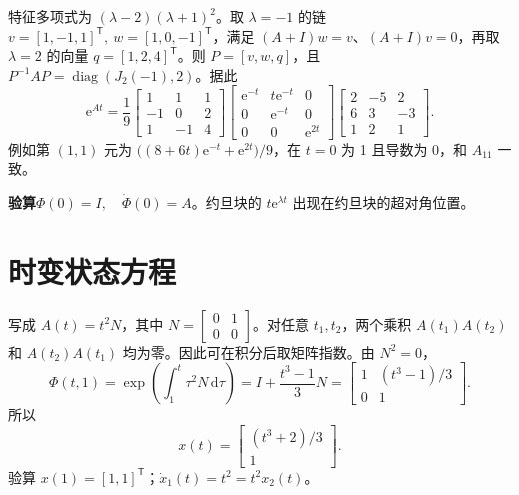 
\sol 特征多项式为 $(\lambda-2)(\lambda+1)^2$。取 $\lambda=-1$ 的链 $v=[1,-1,1]^{\mathsf T},\ w=[1,0,-1]^{\mathsf T}$，满足 $(A+I)w=v$、$(A+I)v=0$，再取 $\lambda=2$ 的向量 $q=[1,2,4]^{\mathsf T}$。则 $P=[v,w,q]$，且 $P^{-1}AP=\operatorname{diag}(J_2(-1),2)$。据此
\[
\mathrm e^{At}=\frac19
\begin{bmatrix}1&1&1\\-1&0&2\\1&-1&4\end{bmatrix}
\begin{bmatrix}\mathrm e^{-t}&t\mathrm e^{-t}&0\\0&\mathrm e^{-t}&0\\0&0&\mathrm e^{2t}\end{bmatrix}
\begin{bmatrix}2&-5&2\\6&3&-3\\1&2&1\end{bmatrix}.
\]
例如第 $(1,1)$ 元为 $\bigl((8+6t)\mathrm e^{-t}+\mathrm e^{2t}\bigr)/9$，在 $t=0$ 为 1 且导数为 0，和 $A_{11}$ 一致。

\noindent\textbf{验算}\quad $\Phi(0)=I,\quad \dot\Phi(0)=A$。约旦块的 $t\mathrm e^{\lambda t}$ 出现在约旦块的超对角位置。

\section{时变状态方程}



\sol 写成 $A(t)=t^2N$，其中 $N=\begin{bmatrix}0&1\\0&0\end{bmatrix}$。对任意 $t_1,t_2$，两个乘积 $A(t_1)A(t_2)$ 和 $A(t_2)A(t_1)$ 均为零。因此可在积分后取矩阵指数。由 $N^2=0$，
\[
\Phi(t,1)=\exp\left(\int_1^t\tau^2N\,\mathrm d\tau\right)
=I+\frac{t^3-1}{3}N
=\begin{bmatrix}1&(t^3-1)/3\\0&1\end{bmatrix}.
\]
所以
\[
\boxed{x(t)=\begin{bmatrix}(t^3+2)/3\\1\end{bmatrix}} .
\]
验算 $x(1)=[1,1]^{\mathsf T}$；$\dot x_1(t)=t^2=t^2x_2(t)$。

